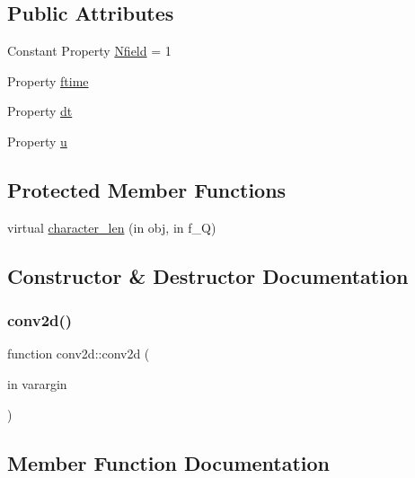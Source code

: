 \subsection*{Public Attributes}
\begin{DoxyCompactItemize}
\item 
Constant Property \hyperlink{classconv2d_a66271871a00e1f96c5b2107b4619121d}{Nfield} = 1
\item 
Property \hyperlink{classconv2d_a03569565a9fce8740e54ebba69a4d0da}{ftime}
\item 
Property \hyperlink{classconv2d_acfbd91a2c46eaceeab325f312790663b}{dt}
\item 
Property \hyperlink{classconv2d_acca7586773892ccdfd176584c44399ca}{u}
\end{DoxyCompactItemize}
\subsection*{Protected Member Functions}
\begin{DoxyCompactItemize}
\item 
virtual \hyperlink{classconv2d_a2a9302ee21fb44a98550dcae0fa1d855}{character\+\_\+len} (in obj, in f\+\_\+Q)
\end{DoxyCompactItemize}


\subsection{Constructor \& Destructor Documentation}
\mbox{\label{classconv2d_a4a8e998daa8c438d1610ed81a71f38e1}} 
\subsubsection{\texorpdfstring{conv2d()}{conv2d()}}
{\footnotesize\ttfamily function conv2d\+::conv2d (\begin{DoxyParamCaption}\item[{in}]{varargin }\end{DoxyParamCaption})}



\subsection{Member Function Documentation}
\mbox{\label{classconv2d_a2a9302ee21fb44a98550dcae0fa1d855}} 
